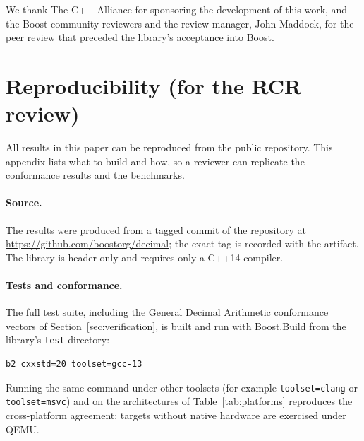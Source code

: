 \documentclass[acmsmall]{acmart}
\begin{document}
\begin{acks}
  We thank The C++ Alliance for sponsoring the development of this work, and the Boost
  community reviewers and the review manager, John Maddock, for the peer review that
  preceded the library's acceptance into Boost.
\end{acks}




\appendix
\section{Reproducibility (for the RCR review)}
\label{app:rcr}

All results in this paper can be reproduced from the public repository. This appendix lists
what to build and how, so a reviewer can replicate the conformance results and the
benchmarks.

\paragraph{Source.}
The results were produced from a tagged commit of the repository at
\url{https://github.com/boostorg/decimal}; the exact tag is recorded with the artifact. The
library is header-only and requires only a C++14 compiler.

\paragraph{Tests and conformance.}
The full test suite, including the General Decimal Arithmetic conformance vectors of
Section~\ref{sec:verification}, is built and run with Boost.Build from the library's
\texttt{test} directory:
\begin{verbatim}
b2 cxxstd=20 toolset=gcc-13
\end{verbatim}
Running the same command under other toolsets (for example \texttt{toolset=clang} or
\texttt{toolset=msvc}) and on the architectures of Table~\ref{tab:platforms} reproduces the
cross-platform agreement; targets without native hardware are exercised under QEMU.
\end{document}
